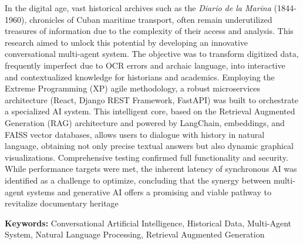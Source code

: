 \englishabstract

\parskip 10pt  \setlength{\parindent}{0pc}

In the digital age, vast historical archives such as the \textit{Diario de la Marina} (1844-1960), chronicles of Cuban maritime transport, often remain underutilized treasures of information due to the complexity of their access and analysis. This research aimed to unlock this potential by developing an innovative conversational multi-agent system. The objective was to transform digitized data, frequently imperfect due to OCR errors and archaic language, into interactive and contextualized knowledge for historians and academics. Employing the Extreme Programming (XP) agile methodology, a robust microservices architecture (React, Django REST Framework, FastAPI) was built to orchestrate a specialized AI system. This intelligent core, based on the Retrieval Augmented Generation (RAG) architecture and powered by LangChain, embeddings, and FAISS vector databases, allows users to dialogue with history in natural language, obtaining not only precise textual answers but also dynamic graphical visualizations. Comprehensive testing confirmed full functionality and security. While performance targets were met, the inherent latency of synchronous AI was identified as a challenge to optimize, concluding that the synergy between multi-agent systems and generative AI offers a promising and viable pathway to revitalize documentary heritage

\textbf{Keywords:} Conversational Artificial Intelligence, Historical Data, Multi-Agent System, Natural Language Processing, Retrieval Augmented Generation